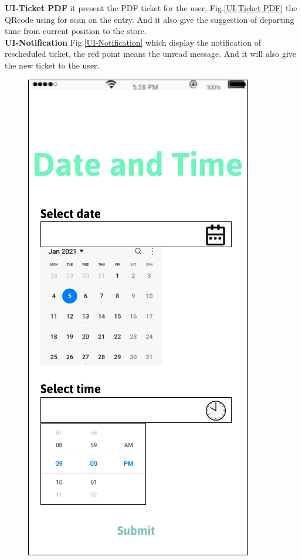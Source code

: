 \documentclass[a4paper,12pt]{report}
\begin{document}
\textbf{UI-Ticket PDF} it present the PDF ticket for the user, Fig.\ref{UI-Ticket PDF} the QRcode using for scan on the entry. And it also give the suggestion of departing time from current position to the store.~\\
 
\textbf{UI-Notification}  Fig.\ref{UI-Notification} which display the notification of rescheduled ticket, the red point means the unread message. And it will also give the new ticket to the user.



\begin{figure}[H]
	\begin{minipage}[t]{0.56\linewidth}
		\centering
		\includegraphics[scale=0.5]{UI-Date Time.png}

\end{minipage}
\end{figure}
\end{document}
